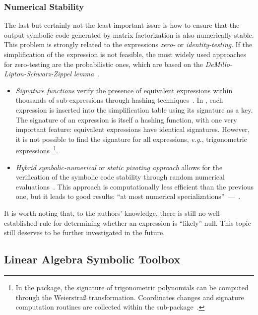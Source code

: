 \subsubsection{Numerical Stability}

The last but certainly not the least important issue is how to ensure that the output symbolic code generated by matrix factorization is also numerically stable. This problem is strongly related to the expressions \emph{zero-} or \emph{identity-testing}. If the simplification of the expression is not feasible, the most widely used approaches for zero-testing are the probabilistic ones, which are based on the \emph{DeMillo-Lipton-Schwarz-Zippel lemma}~\cite{demillo1978probabilistic,schwartz1980fast,zippel1979probabilistic}.
%
\begin{itemize}
    \item \emph{Signature functions} verify the presence of equivalent expressions within thousands of sub-expressions through hashing techniques~\cite{char1984design,gonnet1984determining,gonnet1986results,monagan1994signature}. In \Maple{}, each expression is inserted into the simplification table using its signature as a key. The signature of an expression is itself a hashing function, with one very important feature: equivalent expressions have identical signatures. However, it is not possible to find the signature for all expressions, \emph{e.g.}, trigonometric expressions~\cite{cox1994ideals,zhou2005implicit}\footnote{In the \LEM{} package, the signature of trigonometric polynomials can be computed through the Weierstra{\ss} transformation. Coordinates changes and signature computation routines are collected within the \SIG{} sub-package~\cite{lem}.}.
    \item \emph{Hybrid symbolic-numerical} or \emph{static pivoting approach} allows for the verification of the symbolic code stability through random numerical evaluations~\cite{giesbrecht2014symbolic,li1998making}. This approach is computationally less efficient than the previous one, but it leads to good results: ``at most numerical specializations''~---~\cite{giesbrecht2014symbolic}.
\end{itemize}
%
It is worth noting that, to the authors' knowledge, there is still no well-established rule for determining whether an expression is ``likely'' null. This topic still deserves to be further investigated in the future.

\subsection{Linear Algebra Symbolic Toolbox}

